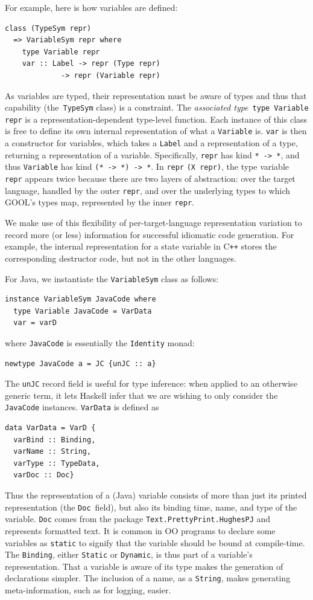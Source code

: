 \documentclass[sigplan,review,anonymous,prologue,dvipsnames]{acmart}
\newcommand{\Cplusplus}{C\texttt{++}}
\begin{document}
For example, here is how variables are defined:
\begin{lstlisting}
class (TypeSym repr)
  => VariableSym repr where
    type Variable repr
    var :: Label -> repr (Type repr)
             -> repr (Variable repr)
\end{lstlisting}
As variables are typed, their representation must be aware of types and
thus that capability (the~\verb|TypeSym| class) is a constraint.  The
\emph{associated type}~\verb|type Variable repr| is a representation-dependent
type-level function.  Each instance of this
class is free to define its own internal representation of what a
\verb|Variable| is. \verb|var| is then a constructor for variables,
which takes a \verb|Label| and a representation of a type, returning
a representation of a variable.  Specifically, \verb|repr| has kind
\verb|* -> *|, and thus \verb|Variable| has kind \verb|(* -> *) -> *|.
In \verb|repr| \verb|(X repr)|, the type variable \verb|repr| appears
twice because there are two layers of abstraction: over the target
language, handled by the outer \verb|repr|, and over the underlying
types to which GOOL's types map, represented by the inner \verb|repr|.

We make use of this flexibility of per-target-language representation
variation to record more (or less) information for
successful idiomatic code generation. For example, the internal representation for a 
state variable in \Cplusplus{} stores the corresponding destructor code,
but not in the other languages.

For Java, we instantiate the \verb|VariableSym| class as follows:
\begin{lstlisting}
instance VariableSym JavaCode where
  type Variable JavaCode = VarData
  var = varD
\end{lstlisting}
where \verb|JavaCode| is essentially the \verb|Identity| monad:
\begin{lstlisting}
newtype JavaCode a = JC {unJC :: a}
\end{lstlisting}
The \verb|unJC| record field is useful for type inference: when applied to
an otherwise generic term, it lets Haskell infer that we are wishing
to only consider the \verb|JavaCode| instances.  \verb|VarData| is defined as
\begin{lstlisting}
data VarData = VarD {
  varBind :: Binding,
  varName :: String,
  varType :: TypeData,
  varDoc :: Doc}
\end{lstlisting}
Thus the representation of a (Java) variable consists of more than just its
printed representation (the \verb|Doc|~field), but also its binding time,
name, and type of the variable. \verb|Doc| comes from the package 
\verb|Text.PrettyPrint.HughesPJ| and represents formatted text. It is common in 
OO programs to declare some variables as \verb|static| to signify that the 
variable should be bound at compile-time. The \verb|Binding|, either 
\verb|Static| or \verb|Dynamic|, is thus part of a variable's representation.
That a variable is aware of its type makes the generation of declarations
simpler. The inclusion of a name, as a \verb|String|, makes generating
meta-information, such as for logging, easier.
\end{document}
